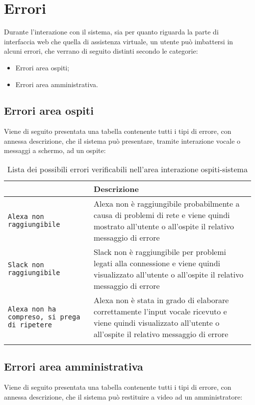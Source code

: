 \documentclass[../ManualeUtente_v2.0.0.tex]{subfiles}
\begin{document}
	\section{Errori}
		Durante l'interazione con il sistema, sia per quanto riguarda la parte di interfaccia web che quella di assistenza virtuale, un utente può imbattersi in alcuni errori, che verrano di seguito distinti secondo le categorie:
		\begin{itemize}
			\item Errori area ospiti;
			\item Errori area amministrativa.
		\end{itemize}

		\subsection{Errori area ospiti}
			Viene di seguito presentata una tabella contenente tutti i tipi di errore, con annessa descrizione, che il sistema può presentare, tramite interazione vocale o messaggi a schermo, ad un ospite:

			\begin{longtable}[c] { >{\centering\arraybackslash}p{5cm} p{10cm} }
				\toprule
				{\textbf{Errore}} & {\textbf{Descrizione}} \\
				\midrule
				\texttt{Alexa non raggiungibile} & Alexa non è raggiungibile probabilmente a causa di problemi di rete e viene quindi mostrato all’utente o all’ospite il relativo messaggio di errore \\
		 		\addlinespace[0.3em]
				\midrule
				\texttt{Slack non raggiungibile} & Slack non è raggiungibile per problemi legati alla connessione e viene quindi visualizzato all’utente o all’ospite il relativo messaggio di errore \\
				\addlinespace[0.3em]
				\midrule
				\texttt{Alexa non ha compreso, si prega di ripetere} & Alexa non è stata in grado di elaborare correttamente l'input vocale ricevuto e viene quindi visualizzato all’utente o all’ospite il relativo messaggio di errore \\
		 		\addlinespace[0.3em]
		 		\bottomrule
		 		\caption{Lista dei possibili errori verificabili nell'area interazione ospiti-sistema}
		 	\end{longtable}

		\subsection{Errori area amministrativa}
			Viene di seguito presentata una tabella contenente tutti i tipi di errore, con annessa descrizione, che il sistema può restituire a video ad un amministratore:
\end{document}
